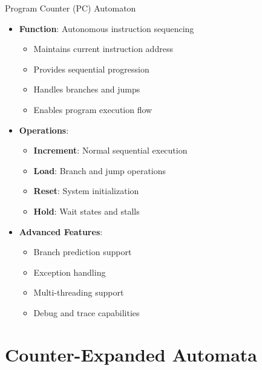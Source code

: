 \documentclass[aspectratio=169,11pt]{beamer}
\newcommand{\concept}[1]{\textbf{\color{accentcolor}#1}}
\begin{document}
\begin{frame}{Program Counter (PC) Automaton}
\begin{itemize}
\item \concept{Function}: Autonomous instruction sequencing
\begin{itemize}
\item Maintains current instruction address
\item Provides sequential progression
\item Handles branches and jumps
\item Enables program execution flow
\end{itemize}
\vspace{0.5cm}
\item \concept{Operations}:
\begin{itemize}
\item \textbf{Increment}: Normal sequential execution
\item \textbf{Load}: Branch and jump operations
\item \textbf{Reset}: System initialization
\item \textbf{Hold}: Wait states and stalls
\end{itemize}
\vspace{0.3cm}
\item \concept{Advanced Features}:
\begin{itemize}
\item Branch prediction support
\item Exception handling
\item Multi-threading support
\item Debug and trace capabilities
\end{itemize}
\end{itemize}
\end{frame}

\section{Counter-Expanded Automata}
\end{document}

